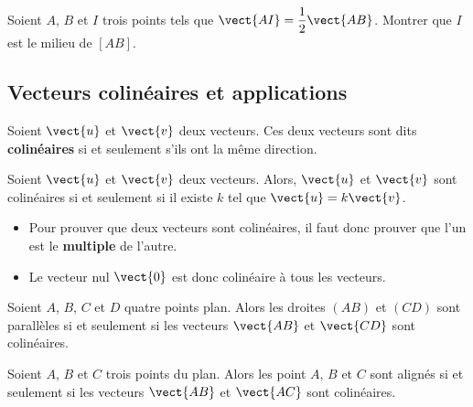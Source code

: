 \documentclass{article}
\begin{document}
\begin{example}
Soient $A$, $B$ et $I$ trois points tels que $\vect{AI} = \dfrac{1}{2}\vect{AB}$. Montrer que $I$ est le milieu de $[AB]$.

\emptybox{2cm}
\end{example}



\newpage
\subsection{Vecteurs colinéaires et applications}
\begin{tcolorbox}
\begin{definition}
Soient $\vect{u}$ et $\vect{v}$ deux vecteurs. Ces deux vecteurs sont dits \textbf{colinéaires} si et seulement s'ils ont la même direction.
\end{definition}
\end{tcolorbox}

\begin{proposition}
Soient $\vect{u}$ et $\vect{v}$ deux vecteurs. Alors, $\vect{u}$ et $\vect{v}$ sont colinéaires si et seulement si il existe $k$ tel que $\vect{u} = k \vect{v}$. 
\end{proposition}

\begin{remark}
\hfill
\begin{itemize}
\item Pour prouver que deux vecteurs sont colinéaires, il faut donc prouver que l'un est le \textbf{multiple} de l'autre.
\item Le vecteur nul $\vect{0}$ est donc colinéaire à tous les vecteurs.
\end{itemize}
\end{remark}

\begin{proposition}
Soient $A$, $B$, $C$ et $D$ quatre points plan. Alors les droites $(AB)$ et $(CD)$ sont parallèles si et seulement si les vecteurs $\vect{AB}$ et $\vect{CD}$ sont colinéaires. 
\end{proposition}

\begin{proposition}
Soient $A$, $B$ et $C$ trois points du plan. Alors les point $A$, $B$ et $C$ sont alignés si et seulement si les vecteurs $\vect{AB}$ et $\vect{AC}$ sont colinéaires.
\end{proposition}
    
\end{document}
